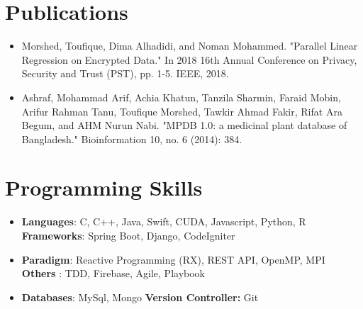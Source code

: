 \documentclass[letterpaper,11pt]{article}
\newcommand{\resumeItem}[2]{
  \item\small{
    \textbf{#1}{: #2 \vspace{-2pt}}
  }
}
\newcommand{\resumeSubItem}[2]{\resumeItem{#1}{#2}\vspace{-4pt}}
\newcommand{\resumeSubHeadingListStart}{\begin{itemize}[leftmargin=*]}
\newcommand{\resumeSubHeadingListEnd}{\end{itemize}}
\begin{document}
\section{Publications}
    \resumeSubHeadingListStart
        \item
            \small{Morshed, Toufique, Dima Alhadidi, and Noman Mohammed. "Parallel Linear Regression on Encrypted Data." In 2018 16th Annual Conference on Privacy, Security and Trust (PST), pp. 1-5. IEEE, 2018.}
        \item
            \small{Ashraf, Mohammad Arif, Achia Khatun, Tanzila Sharmin, Faraid Mobin, Arifur Rahman Tanu, Toufique Morshed, Tawkir Ahmad Fakir, Rifat Ara Begum, and AHM Nurun Nabi. "MPDB 1.0: a medicinal plant database of Bangladesh." Bioinformation 10, no. 6 (2014): 384.}
    \resumeSubHeadingListEnd
    
\section{Programming Skills}
    \resumeSubHeadingListStart
        \resumeSubItem
            {Languages}
            {C, C++, Java, Swift, CUDA, Javascript, Python, R}
            \hfill
            \textbf{Frameworks}{: Spring Boot, Django, CodeIgniter}
        \resumeSubItem
            {Paradigm}
            {Reactive Programming (RX), REST API, OpenMP, MPI}
            \hfill
            \textbf{Others}
            {: TDD, Firebase, Agile, Playbook} 
        \resumeSubItem
            {Databases}
            {MySql, Mongo}
            \hfill
            \textbf{Version Controller:}
            {Git}
    \resumeSubHeadingListEnd
    
\end{document}
